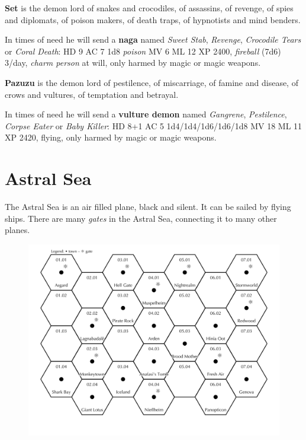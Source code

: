 \documentclass[11pt]{bxart}
\begin{document}
\textbf{Set} is the demon lord of snakes and crocodiles, of assassins, of revenge, of spies and diplomats, of poison makers, of death traps, of hypnotists and mind benders.

In times of need he will send a \textbf{naga} named \textit{Sweet Stab}, \textit{Revenge}, \textit{Crocodile Tears} or \textit{Coral Death}: HD 9 AC 7 1d8 \textit{poison} MV 6 ML 12 XP 2400, \textit{fireball} (7d6) 3/day, \textit{charm person} at will, only harmed by magic or magic weapons.

\textbf{Pazuzu} is the demon lord of pestilence, of miscarriage, of famine and disease, of crows and vultures, of temptation and betrayal.

In times of need he will send a \textbf{vulture demon} named \textit{Gangrene}, \textit{Pestilence}, \textit{Corpse Eater} or \textit{Baby Killer}: HD 8+1 AC 5 1d4/1d4/1d6/1d6/1d8 MV 18 ML 11 XP 2420, flying, only harmed by magic or magic weapons.

\section{Astral Sea}

The Astral Sea is an air filled plane, black and silent. It can be sailed by flying ships. There are many \textit{gates} in the Astral Sea, connecting it to many other planes.

\begin{figure}
  \centering
  \includegraphics[width=15cm]{Astral-Sea.jpg}
\end{figure}
\end{document}
